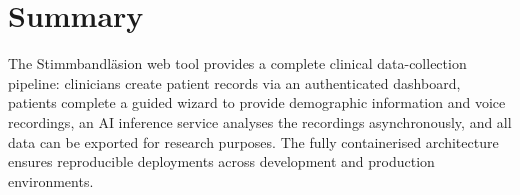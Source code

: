 \documentclass[12pt,a4paper]{article}
\begin{document}
\section{Summary}
\label{sec:summary}

The Stimmbandl\"asion web tool provides a complete clinical data-collection
pipeline: clinicians create patient records via an authenticated dashboard,
patients complete a guided wizard to provide demographic information and voice
recordings, an AI inference service analyses the recordings asynchronously, and
all data can be exported for research purposes. The fully containerised
architecture ensures reproducible deployments across development and production
environments.
\end{document}
